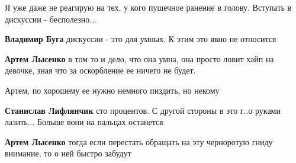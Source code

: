 \begin{itemize}
Я уже даже не реагирую на тех, у кого пушечное ранение в голову. Вступать в дискуссии - бесполезно...

\begin{itemize}
 
\textbf{Владимир Буга} дискуссии - это для умных. К этим это явно не относится

 
\textbf{Артем Лысенко} в том то и дело, что она умна, она просто ловит хайп на девочке, зная что за оскорбление ее ничего не будет.
\end{itemize}

 
Артем, по хорошему ее нужно немного пиздить, но некому 🤣

\begin{itemize}
 
\textbf{Станислав Лифлянчик} сто процентов. С другой стороны в это г..о руками лазить... Больше вони на пальцах останется

 
\textbf{Артем Лысенко} тогда если перестать обращать на эту черноротую гниду внимание, то о ней быстро забудут

 

\end{itemize}
\end{itemize}
